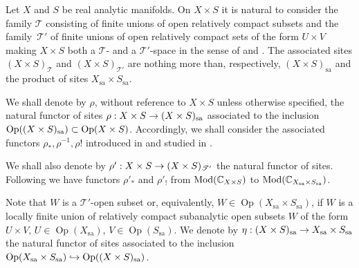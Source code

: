 \documentclass[english]{smfart}
\numberwithin{subsection}{section}
\def\sht{\mathcal{T}}
\newcommand{\Mod}{\mathrm{Mod}}
\newcommand{\sa}{\mathrm{sa}}
\newcommand{\XS}{X\times S}
\DeclareMathOperator{\Op}{Op}
\numberwithin{equation}{section}
\theoremstyle{plain}
\theoremstyle{definition}
\def\to{\mathchoice{\longrightarrow}{\rightarrow}{\rightarrow}{\rightarrow}}
\def\hto{\mathrel{\lhook\joinrel\to}}
\begin{document}
Let $X$ and $S$ be real analytic manifolds. On $\XS$ it is natural to consider the family $\sht$ consisting of finite unions of open relatively compact subsets and the family~$\sht'$ of finite unions of open relatively compact sets of the form $U\times V$ making $\XS$ both a $\sht$- and a $\sht'$-space in the sense of \cite{E-P16} and \cite{K-S96}. The associated sites $({\XS})_{\sht}$ and $({\XS})_{\sht'}$ are nothing more than, respectively, $(\XS)_\sa$ and the product of sites $X_\sa\times S_\sa$.

We shall denote by $\rho$, without reference to $\XS$ unless otherwise specified, the natural functor of sites $\rho:\XS \to (\XS)_\sa$ associated to the inclusion $\Op((X\times\nobreak S)_\sa) \subset \Op(\XS)$. Accordingly, we shall consider the associated functors $\rho_{*}, \rho^{-1}, \rho!$ introduced in \cite{K-Sch06} and studied in \cite{Prelli08}.

We shall also denote by $\rho':\XS \to (\XS)_{\sht'}$ the natural functor of sites. Following \cite{E-P16} we have functors $\rho'_*$ and $\rho'_!$ from $\Mod(\CC_{\XS})$ to $\Mod(\CC_{X_\sa\times S_\sa})$.

Note that $W$ is a $\sht'$-open subset or, equivalently, $W\in \Op(X_\sa\times S_\sa)$, if $W$ is a locally finite union of relatively compact subanalytic open subsets $W$ of the form $U \times V$, $U \in \Op(X_\sa)$, $V \in \Op(S_\sa)$. We denote by $\eta:(X \times S)_\sa \to X_\sa \times S_\sa$ the natural functor of sites associated to the inclusion $\Op(X_\sa \times S_\sa) \hto \Op((X \times S)_\sa)$.
\end{document}
